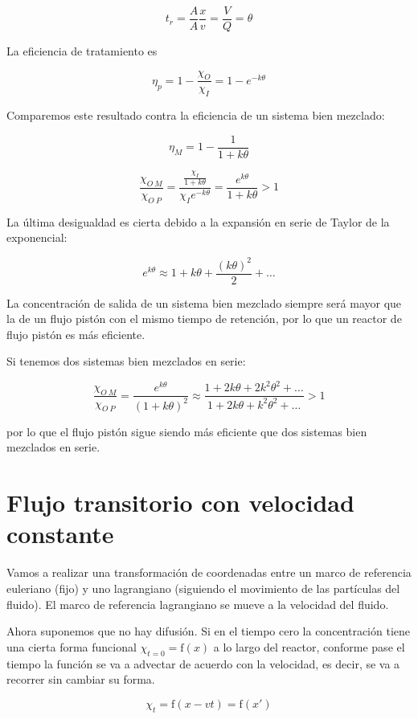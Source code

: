 \documentclass[11pt]{article}
\begin{document}
\[ t_r = \frac{A}{A} \frac{x}{v} = \frac{V}{Q} = \theta \]

La eficiencia de tratamiento es 

\[ \boxed{ \eta_p = 1 - \frac{ \chi_O }{ \chi_I } = 1 - e ^{ -k \theta } } \]

Comparemos este resultado contra la eficiencia de un sistema bien mezclado:

\[ \eta_M = 1 - \frac{ 1 }{ 1 + k \theta } \]

\[ \frac{ \chi_{ O \ M } }{ \chi_{ O \ P } } = \frac{ \frac{ \chi_I }{ 1 + k \theta } }{ \chi_I e ^ { -k \theta } } = \frac{ e ^{ k \theta } }{ 1 + k \theta } > 1 \]

La última desigualdad es cierta debido a la expansión en serie de Taylor de la exponencial:

\[ e ^ { k \theta } \approx 1 + k \theta + \frac{ \left( k \theta \right) ^ 2 }{2} + \hdots \]

La concentración de salida de un sistema bien mezclado siempre será mayor que la de un flujo pistón con el mismo tiempo de retención, por lo que un reactor de flujo pistón es más eficiente.

Si tenemos dos sistemas bien mezclados en serie:

\[ \frac{ \chi_{ O \ M } }{ \chi_{ O \ P } }= \frac{ e ^{ k \theta } }{ \left( 1 + k \theta \right) ^ 2 } \approx \frac{ 1 + 2 k \theta + 2 k^2 \theta^2 + \hdots }{ 1 + 2 k \theta + k^2 \theta^2 + \hdots } > 1 \]

por lo que el flujo pistón sigue siendo más eficiente que dos sistemas bien mezclados en serie.

\section{Flujo transitorio con velocidad constante}

Vamos a realizar una transformación de coordenadas entre un marco de referencia euleriano (fijo) y uno lagrangiano (siguiendo el movimiento de las partículas del fluido). El marco de referencia lagrangiano se mueve a la velocidad del fluido.

Ahora suponemos que no hay difusión. Si en el tiempo cero la concentración tiene una cierta forma funcional \( \chi_{ t = 0 } = \mathrm f \left( x \right) \) a lo largo del reactor, conforme pase el tiempo la función se va a advectar de acuerdo con la velocidad, es decir, se va a recorrer sin cambiar su forma.

\[ \chi_t = \mathrm f \left( x - v t \right) = \mathrm f \left( x' \right) \]
\end{document}
